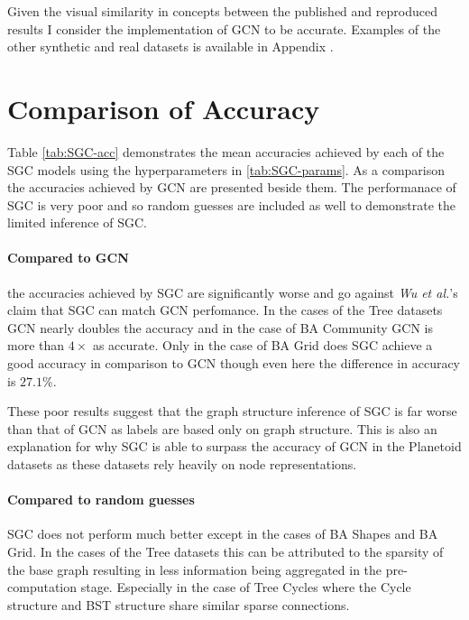 Given the visual similarity in concepts between the published and reproduced results I consider the implementation of GCN to be accurate.
Examples of the other synthetic and real datasets is available in Appendix .

\section{Comparison of Accuracy}
\label{sec:comp-acc}


Table \ref{tab:SGC-acc} demonstrates the mean accuracies achieved by each of the SGC models using the hyperparameters in \ref{tab:SGC-params}.
As a comparison the accuracies achieved by GCN are presented beside them.
The performanace of SGC is very poor and so random guesses are included as well to demonstrate the limited inference of SGC.

\paragraph{Compared to GCN}
the accuracies achieved by SGC are significantly worse and go against \textit{Wu et al.}'s claim that SGC can match GCN perfomance.
In the cases of the Tree datasets GCN nearly doubles the accuracy and in the case of BA Community GCN is more than $4\times$ as accurate.
Only in the case of BA Grid does SGC achieve a good accuracy in comparison to GCN though even here the difference in accuracy is $27.1$\%.

These poor results suggest that the graph structure inference of SGC is far worse than that of GCN as labels are based only on graph structure.
This is also an explanation for why SGC is able to surpass the accuracy of GCN in the Planetoid\cite{kipf2016semi} datasets as these datasets rely heavily on node representations.

\paragraph{Compared to random guesses}
SGC does not perform much better except in the cases of BA Shapes and BA Grid.
In the cases of the Tree datasets this can be attributed to the sparsity of the base graph resulting in less information being aggregated in the pre-computation stage.
Especially in the case of Tree Cycles where the Cycle structure and BST structure share similar sparse connections.

